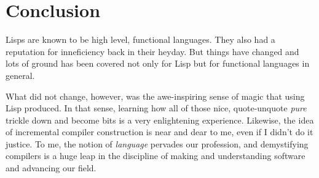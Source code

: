 \chapter*{Conclusion}


Lisps are known to be high level, functional languages. They also had a reputation for inneficiency
back in their heyday. But things have changed  and lots of ground has been covered not only for Lisp but for
functional languages in general.

What did not change, however, was the awe-inspiring sense of magic that using Lisp produced. In that sense,
learning how all of those nice, quote-unquote  \textit{pure} trickle down
and become bits is a very enlightening experience. Likewise, the idea of incremental compiler construction
is near and dear to me, even if I didn't do it justice. To me, the notion of \textit{language} pervades
our profession, and demystifying compilers is a huge leap in the discipline of making and understanding
software and advancing our field.
